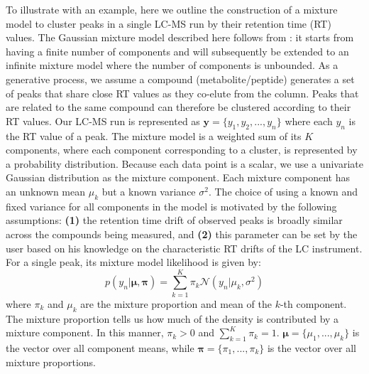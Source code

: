 To illustrate with an example, here we outline the construction of a mixture model to cluster peaks in a single LC-MS run by their retention time (RT) values. The Gaussian mixture model described here follows from \cite{Rasmussen2000}: it starts from having a finite number of components and will subsequently be extended to an infinite mixture model where the number of components is unbounded. As a generative process, we assume a compound (metabolite/peptide) generates a set of peaks that share close RT values as they co-elute from the column. Peaks that are related to the same compound can therefore be clustered according to their RT values. Our LC-MS run is represented as $\mathbf{y}=\{y_{1},y_{2},...,y_{n}\}$ where each $y_n$ is the RT value of a peak. The mixture model is a weighted sum of its $K$ components, where each component corresponding to a cluster, is represented by a probability distribution. Because each data point is a scalar, we use a univariate Gaussian distribution as the mixture component. Each mixture component has an unknown mean $\mu_{k}$ but a known variance $\sigma^2$. The choice of using a known and fixed variance for all components in the model is motivated by the following assumptions: \textbf{(1)} the retention time drift of observed peaks is broadly similar across the compounds being measured, and \textbf{(2)} this parameter can be set by the user based on his knowledge on the characteristic RT drifts of the LC instrument. For a single peak, its mixture model likelihood is given by:
\begin{equation}
p(y_n \vert \boldsymbol{\mu},\boldsymbol{\pi}) = \sum_{k=1}^{K} \pi_k \mathcal{N}(y_n \vert \mu_k,\sigma^2)
\end{equation}
where $\pi_k$ and $\mu_k$ are the mixture proportion and mean of the $k$-th component. The mixture proportion tells us how much of the density is contributed by a mixture component. In this manner, $\pi_{k}>0$ and $\sum_{k=1}^{K}\pi_{k}=1$. $\boldsymbol{\mu}=\{\mu_{1},...,\mu_{k}\}$ is the vector over all component means, while $\boldsymbol{\pi}=\{\pi_{1},...,\pi_{k}\}$ is the vector over all mixture proportions.


